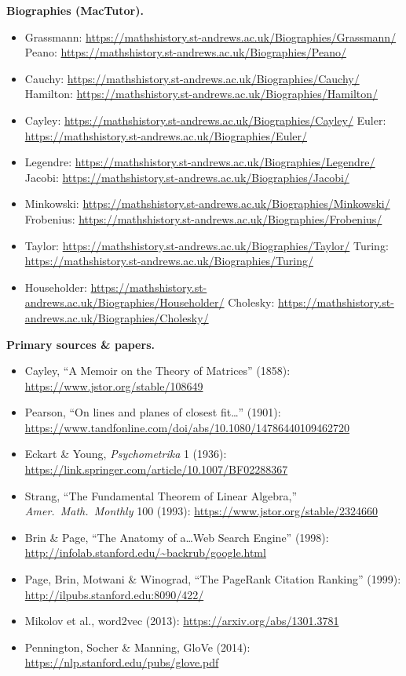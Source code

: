 \documentclass[11pt]{article}
\begin{document}
\textbf{Biographies (MacTutor).}
\begin{itemize}[leftmargin=1.4em,itemsep=1pt]
  \item Grassmann: \url{https://mathshistory.st-andrews.ac.uk/Biographies/Grassmann/} \quad
        Peano: \url{https://mathshistory.st-andrews.ac.uk/Biographies/Peano/}
  \item Cauchy: \url{https://mathshistory.st-andrews.ac.uk/Biographies/Cauchy/} \quad
        Hamilton: \url{https://mathshistory.st-andrews.ac.uk/Biographies/Hamilton/}
  \item Cayley: \url{https://mathshistory.st-andrews.ac.uk/Biographies/Cayley/} \quad
        Euler: \url{https://mathshistory.st-andrews.ac.uk/Biographies/Euler/}
  \item Legendre: \url{https://mathshistory.st-andrews.ac.uk/Biographies/Legendre/} \quad
        Jacobi: \url{https://mathshistory.st-andrews.ac.uk/Biographies/Jacobi/}
  \item Minkowski: \url{https://mathshistory.st-andrews.ac.uk/Biographies/Minkowski/} \quad
        Frobenius: \url{https://mathshistory.st-andrews.ac.uk/Biographies/Frobenius/}
  \item Taylor: \url{https://mathshistory.st-andrews.ac.uk/Biographies/Taylor/} \quad
        Turing: \url{https://mathshistory.st-andrews.ac.uk/Biographies/Turing/}
  \item Householder: \url{https://mathshistory.st-andrews.ac.uk/Biographies/Householder/} \quad
        Cholesky: \url{https://mathshistory.st-andrews.ac.uk/Biographies/Cholesky/}
\end{itemize}

\textbf{Primary sources \& papers.}
\begin{itemize}[leftmargin=1.4em,itemsep=1pt]
  \item Cayley, ``A Memoir on the Theory of Matrices'' (1858): \url{https://www.jstor.org/stable/108649}
  \item Pearson, ``On lines and planes of closest fit\dots'' (1901): \url{https://www.tandfonline.com/doi/abs/10.1080/14786440109462720}
  \item Eckart \& Young, \emph{Psychometrika} 1 (1936): \url{https://link.springer.com/article/10.1007/BF02288367}
  \item Strang, ``The Fundamental Theorem of Linear Algebra,'' \emph{Amer.\ Math.\ Monthly} 100 (1993): \url{https://www.jstor.org/stable/2324660}
  \item Brin \& Page, ``The Anatomy of a\dots Web Search Engine'' (1998): \url{http://infolab.stanford.edu/~backrub/google.html}
  \item Page, Brin, Motwani \& Winograd, ``The PageRank Citation Ranking'' (1999): \url{http://ilpubs.stanford.edu:8090/422/}
  \item Mikolov et al., word2vec (2013): \url{https://arxiv.org/abs/1301.3781}
  \item Pennington, Socher \& Manning, GloVe (2014): \url{https://nlp.stanford.edu/pubs/glove.pdf}
\end{itemize}
\end{document}
